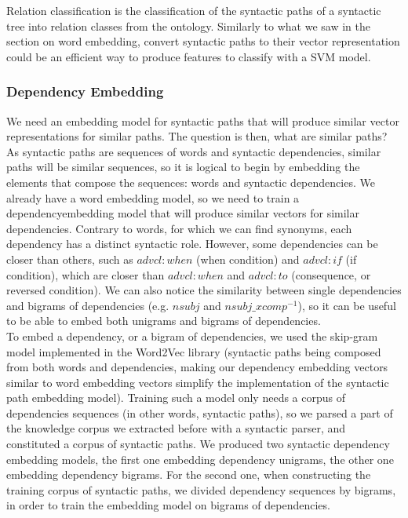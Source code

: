 \documentclass[twocolumn]{article}
\begin{document}
Relation classification is the classification of the syntactic paths of a syntactic tree into relation classes from the ontology. 
Similarly to what we saw in the section on word embedding, convert syntactic paths to their vector representation could be an efficient way to produce features to classify with a SVM model.

\subsubsection{Dependency Embedding}

We need an embedding model for syntactic paths that will produce similar vector representations for similar paths. The question is then, what are similar paths?\\
As syntactic paths are sequences of words and syntactic dependencies, similar paths will be similar sequences, so it is logical to begin by embedding the elements that compose the sequences: words and syntactic dependencies. We already have a word embedding model, so we need to train a dependencyembedding model that will produce similar vectors for similar dependencies. 
Contrary to words, for which we can find synonyms, each dependency has a distinct syntactic role. However, some dependencies can be closer than others, such as $advcl:when$ (when condition) and $advcl:if$ (if condition), which are closer than $advcl:when$ and $advcl:to$ (consequence, or reversed condition). We can also notice the similarity between single dependencies and bigrams of dependencies (e.g. $nsubj$ and $nsubj\_xcomp^{-1}$), so it can be useful to be able to embed both unigrams and bigrams of dependencies.\\
To embed a dependency, or a bigram of dependencies, we used the skip-gram model implemented in the Word2Vec library (syntactic paths being composed from both words and dependencies, making our dependency embedding vectors similar to word embedding vectors simplify the implementation of the syntactic path embedding model). Training such a model only needs a corpus of dependencies sequences (in other words, syntactic paths), so we parsed a part of the knowledge corpus we extracted before with a syntactic parser, and constituted a corpus of syntactic paths. We produced two syntactic dependency embedding models, the first one embedding dependency unigrams, the other one embedding dependency bigrams. For the second one, when constructing the training corpus of syntactic paths, we divided dependency sequences by bigrams, in order to train the embedding model on bigrams of dependencies.
\end{document}
